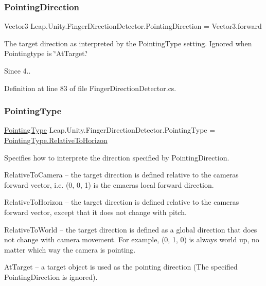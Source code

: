 \subsubsection{\texorpdfstring{PointingDirection}{PointingDirection}}
{\footnotesize\ttfamily Vector3 Leap.\+Unity.\+Finger\+Direction\+Detector.\+Pointing\+Direction = Vector3.\+forward}

The target direction as interpreted by the Pointing\+Type setting. Ignored when Pointingtype is \char`\"{}\+At\+Target.\char`\"{} \begin{DoxySince}{Since}
4.. 
\end{DoxySince}


Definition at line 83 of file Finger\+Direction\+Detector.\+cs.

\mbox{\label{class_leap_1_1_unity_1_1_finger_direction_detector_a2161d1a746e283cce4a95f619fb699c1}} 
\subsubsection{\texorpdfstring{PointingType}{PointingType}}
{\footnotesize\ttfamily \mbox{\hyperlink{namespace_leap_1_1_unity_a34b9e7741bfe47e7a9b1c2bffbe7f4cf}{Pointing\+Type}} Leap.\+Unity.\+Finger\+Direction\+Detector.\+Pointing\+Type = \mbox{\hyperlink{namespace_leap_1_1_unity_a34b9e7741bfe47e7a9b1c2bffbe7f4cfa31999ab3e9ca81aefc5d2bc9c075f580}{Pointing\+Type.\+Relative\+To\+Horizon}}}

Specifies how to interprete the direction specified by Pointing\+Direction.


\begin{DoxyItemize}
\item Relative\+To\+Camera -- the target direction is defined relative to the camera\textquotesingle{}s forward vector, i.\+e. (0, 0, 1) is the cmaera\textquotesingle{}s local forward direction.
\item Relative\+To\+Horizon -- the target direction is defined relative to the camera\textquotesingle{}s forward vector, except that it does not change with pitch.
\item Relative\+To\+World -- the target direction is defined as a global direction that does not change with camera movement. For example, (0, 1, 0) is always world up, no matter which way the camera is pointing.
\item At\+Target -- a target object is used as the pointing direction (The specified Pointing\+Direction is ignored).
\end{DoxyItemize}

